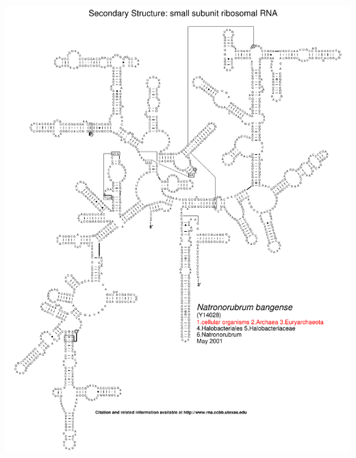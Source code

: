 \documentclass[landscape]{slides}
\begin{document}
\begin{slide}\begin{center}\includegraphics[height=8in]{figs/arc-12}\end{center}\vfill\end{slide}
\end{document}
